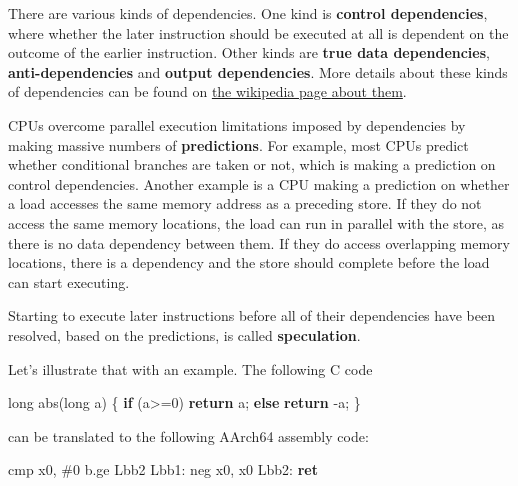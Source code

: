 \documentclass[
  a4paper,
]{report}
\newenvironment{Shaded}{}{}
\newcommand{\BuiltInTok}[1]{\textcolor[rgb]{0.00,0.50,0.00}{#1}}
\newcommand{\ControlFlowTok}[1]{\textcolor[rgb]{0.00,0.44,0.13}{\textbf{#1}}}
\newcommand{\DataTypeTok}[1]{\textcolor[rgb]{0.56,0.13,0.00}{#1}}
\newcommand{\DecValTok}[1]{\textcolor[rgb]{0.25,0.63,0.44}{#1}}
\newcommand{\FunctionTok}[1]{\textcolor[rgb]{0.02,0.16,0.49}{#1}}
\newcommand{\NormalTok}[1]{#1}
\newcommand{\OperatorTok}[1]{\textcolor[rgb]{0.40,0.40,0.40}{#1}}
\begin{document}
There are various kinds of dependencies. One kind is \textbf{control
dependencies}, where whether the later
instruction should be executed at all is dependent on the outcome of the
earlier instruction. Other kinds are \textbf{true data
dependencies}, \textbf{anti-dependencies} and
\textbf{output dependencies}. More details
about these kinds of dependencies can be found on
\href{https://en.wikipedia.org/wiki/Data_dependency}{the wikipedia page
about them}.

CPUs overcome parallel execution limitations imposed by dependencies by
making massive numbers of \textbf{predictions}. For
example, most CPUs predict whether conditional branches are taken or
not, which is making a prediction on control dependencies. Another
example is a CPU making a prediction on whether a load accesses the same
memory address as a preceding store. If they do not access the same
memory locations, the load can run in parallel with the store, as there
is no data dependency between them. If they do access overlapping memory
locations, there is a dependency and the store should complete before
the load can start executing.

Starting to execute later instructions before all of their dependencies
have been resolved, based on the predictions, is called
\textbf{speculation}.

Let's illustrate that with an example. The following C code

\begin{Shaded}
\begin{Highlighting}[]
\DataTypeTok{long}\NormalTok{ abs}\OperatorTok{(}\DataTypeTok{long}\NormalTok{ a}\OperatorTok{)} \OperatorTok{\{}
  \ControlFlowTok{if} \OperatorTok{(}\NormalTok{a}\OperatorTok{\textgreater{}=}\DecValTok{0}\OperatorTok{)}
    \ControlFlowTok{return}\NormalTok{ a}\OperatorTok{;}
  \ControlFlowTok{else}
    \ControlFlowTok{return} \OperatorTok{{-}}\NormalTok{a}\OperatorTok{;}
  \OperatorTok{\}}
\end{Highlighting}
\end{Shaded}

can be translated to the following AArch64 assembly code:

\begin{Shaded}
\begin{Highlighting}[]
        \BuiltInTok{cmp}\NormalTok{     x0}\OperatorTok{,} \OperatorTok{\#}\DecValTok{0}
\NormalTok{        b}\OperatorTok{.}\NormalTok{ge    Lbb2}
\FunctionTok{Lbb1:}
        \BuiltInTok{neg}\NormalTok{     x0}\OperatorTok{,}\NormalTok{ x0}
\FunctionTok{Lbb2:}
        \ControlFlowTok{ret}
\end{Highlighting}
\end{Shaded}
\end{document}

